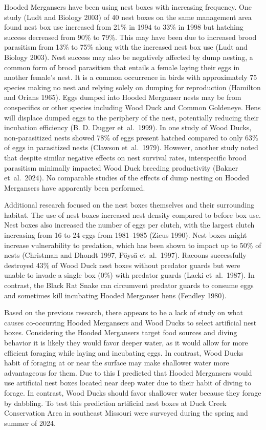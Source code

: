 Hooded Mergansers have been using nest boxes with increasing frequency. One study (Ludt and Biology 2003) of 40 nest boxes on the same management area found nest box use increased from 21\% in 1994 to 33\% in 1998 but hatching success decreased from 90\% to 79\%. This may have been due to increased brood parasitism from 13\% to 75\% along with the increased nest box use (Ludt and Biology 2003). Nest success may also be negatively affected by dump nesting, a common form of brood parasitism that entails a female laying their eggs in another female’s nest. It is a common occurrence in birds with approximately 75 species making no nest and relying solely on dumping for reproduction (Hamilton and Orians 1965). Eggs dumped into Hooded Merganser nests may be from conspecifics or other species including Wood Duck and Common Goldeneye. Hens will displace dumped eggs to the periphery of the nest, potentially reducing their incubation efficiency (B. D. Dugger et~al.~1999).  In one study of Wood Ducks, non-parasitized nests showed 78\% of eggs present hatched compared to only 63\% of eggs in parasitized nests (Clawson et~al.~1979). However, another study noted that despite similar negative effects on nest survival rates, interspecific brood parasitism minimally impacted Wood Duck breeding productivity (Bakner et~al.~2024). No comparable studies of the effects of dump nesting on Hooded Mergansers have apparently been performed.

Additional research focused on the nest boxes themselves and their surrounding habitat. The use of nest boxes increased nest density compared to before box use. Nest boxes also increased the number of eggs per clutch, with the largest clutch increasing from 16 to 24 eggs from 1981–1985 (Zicus 1990).  Nest boxes might increase vulnerability to predation, which has been shown to impact up to 50\% of nests (Christman and Dhondt 1997, Pöysä et~al.~1997). Racoons successfully destroyed 43\% of Wood Duck nest boxes without predator guards but were unable to invade a single box (0\%) with predator guards (Lacki et~al.~1987). In contrast, the Black Rat Snake can circumvent predator guards to consume eggs and sometimes kill incubating Hooded Merganser hens (Fendley 1980).  

Based on the previous research, there appears to be a lack of study on what causes co-occurring Hooded Mergansers and Wood Ducks to select artificial nest boxes. Considering the Hooded Mergansers target food sources and diving behavior it is likely they would favor deeper water, as it would allow for more efficient foraging while laying and incubating eggs. In contrast, Wood Ducks habit of foraging at or near the surface may make shallower water more advantageous for them. Due to this I predicted that Hooded Mergansers would use artificial nest boxes located near deep water due to their habit of diving to forage. In contrast, Wood Ducks should favor shallower water because they forage by dabbling. To test this prediction artificial nest boxes at Duck Creek Conservation Area in southeast Missouri were surveyed during the spring and summer of 2024.  

